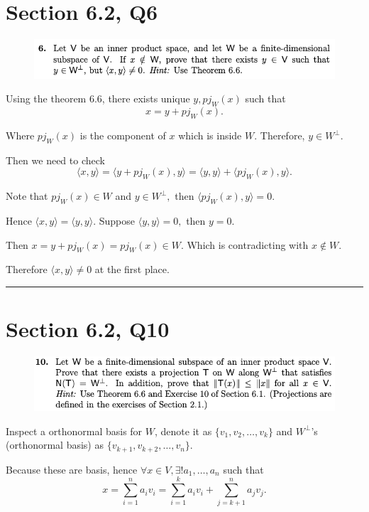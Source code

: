 \documentclass[12pt]{article}%
\begin{document}
\section{Section 6.2, Q6}
\begin{figure}[htp]
    \centering %
    \includegraphics[width = 15cm]{img/Q8.png}
\end{figure}

Using the theorem 6.6, there exists unique $y, pj_{W}(x)$ such that $$x=y+pj_{W}(x).$$ 

Where $pj_{W}(x)$ is the component of $x$ which is inside $W.$ Therefore, $y\in W^{\perp}.$

Then we need to check $$\langle x,y \rangle=\langle y+pj_{W}(x),y \rangle=\langle y,y \rangle+\langle pj_{W}(x),y \rangle.$$

Note that $pj_{W}(x) \in W$ and $y\in W^{\perp},$ then $\langle pj_{W}(x),y \rangle=0.$

Hence $\langle x,y \rangle=\langle y,y \rangle.$ Suppose $\langle y,y \rangle =0,$ then $y=0.$

Then $x=y+pj_{W}(x)=pj_{W}(x)\in W.$ Which is contradicting with $x \notin W.$ 

Therefore $\langle x,y \rangle \neq 0$ at the first place.

\noindent\rule[0.1ex]{\linewidth}{1pt}

\newpage
\section{Section 6.2, Q10}
\begin{figure}[htp]
    \includegraphics[width = 13cm]{img/Q10.png}
\end{figure}

Inspect a orthonormal basis for $W$, denote it as $\{v_1,v_2,\dots, v_k\}$ and $W^{\perp}$'s (orthonormal basis) as 
$\{v_{k+1},v_{k+2},\dots,v_n\}$. 

Because these are basis, hence $\forall x \in V, \exists ! a_1,\dots,a_n$ such that 
$$x=\sum_{i=1}^{n}a_iv_i=\sum_{i=1}^{k}a_iv_i+\sum_{j=k+1}^{n}a_jv_j.$$
\end{document}
